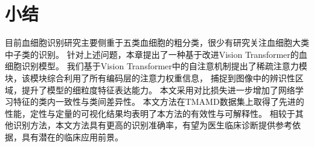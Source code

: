 
\section{小结}
目前血细胞识别研究主要侧重于五类血细胞的粗分类，很少有研究关注血细胞大类中子类的识别。
针对上述问题，本章提出了一种基于改进Vision Transformer的血细胞识别模型。
我们基于Vision Transformer中的自注意机制提出了稀疏注意力模块，该模块综合利用了所有编码层的注意力权重信息，
捕捉到图像中的辨识性区域，提升了模型的细粒度特征表达能力。
本文采用对比损失进一步增加了网络学习特征的类内一致性与类间差异性。
本文方法在TMAMD数据集上取得了先进的性能，定性与定量的可视化结果均表明了本方法的有效性与可解释性。
相较于其他识别方法，本文方法具有更高的识别准确率，有望为医生临床诊断提供参考依据，具有潜在的临床应用前景。